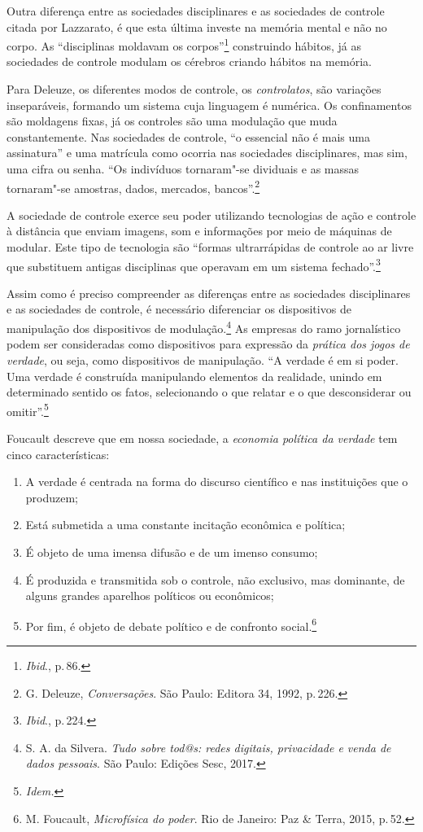 Outra diferença entre as sociedades disciplinares e as sociedades de
controle citada por Lazzarato, é que esta última investe na
memória mental e não no corpo. As ``disciplinas moldavam os corpos''\footnote{\textit{Ibid}., p.\,86.} construindo hábitos, já as sociedades de controle modulam os
cérebros criando hábitos na memória.

Para Deleuze, os diferentes modos de controle, os
\textit{controlatos}, são variações inseparáveis, formando um sistema cuja
linguagem é numérica. Os confinamentos são moldagens fixas, já os
controles são uma modulação que muda constantemente. Nas sociedades de
controle, ``o essencial não é mais uma assinatura'' e uma matrícula como ocorria nas sociedades disciplinares, mas sim, uma cifra ou senha. ``Os indivíduos tornaram"-se dividuais e as massas tornaram"-se
amostras, dados, mercados, bancos''.\footnote{G. Deleuze, \textit{Conversações}. São Paulo: Editora 34, 1992, p.\,226.}

A sociedade de controle exerce seu poder utilizando tecnologias de ação
e controle à distância que enviam imagens, som e informações por meio de
máquinas de modular. Este tipo de tecnologia são ``formas ultrarrápidas
de controle ao ar livre que substituem antigas disciplinas que operavam
em um sistema fechado''.\footnote{\textit{Ibid}., p.\,224.}

Assim como é preciso compreender as diferenças entre as sociedades
disciplinares e as sociedades de controle, é necessário diferenciar os
dispositivos de manipulação dos dispositivos de modulação.\footnote{S. A. da Silvera. \textit{Tudo sobre tod@s: redes digitais, privacidade e venda de dados pessoais}. São Paulo: Edições Sesc, 2017.} As empresas do ramo jornalístico podem ser consideradas como
dispositivos para expressão da \textit{prática dos jogos de verdade}, ou
seja, como dispositivos de manipulação. ``A verdade é em si poder. Uma
verdade é construída manipulando elementos da realidade, unindo em
determinado sentido os fatos, selecionando o que relatar e o que
desconsiderar ou omitir''.\footnote{\textit{Idem.}}

Foucault descreve que em nossa sociedade, a \textit{economia política da verdade} tem cinco características: 

\begin{enumerate}
\item A verdade é centrada na forma
do discurso científico e nas instituições que o produzem; 

\item Está submetida a uma constante incitação econômica e política;

\item É objeto de uma imensa difusão e de um imenso consumo; 

\item É produzida e transmitida sob o controle, não exclusivo, mas dominante, de alguns grandes aparelhos políticos ou econômicos; 

\item Por fim, é objeto de debate político e de confronto social.\footnote{M. Foucault, \textit{Microfísica do poder}. Rio de Janeiro: Paz \& Terra, 2015, p.\,52.}
\end{enumerate}

